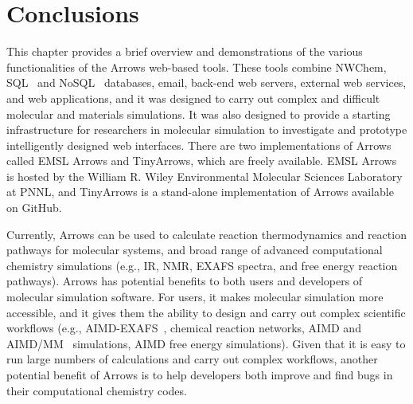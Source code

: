 \documentclass[runningheads,a4paper]{llncs}
\begin{document}
\section{Conclusions}

This chapter provides a brief overview and demonstrations of the various functionalities of the Arrows web-based tools. These tools combine NWChem, SQL~\cite{chamberlin1974sequel,hursch1988sql} and NoSQL~\cite{stonebraker2010sql} databases, email, back-end web servers, external web services, and web applications, and it was designed to carry out complex and difficult molecular and materials simulations.  It was also designed to provide a starting infrastructure for researchers in molecular simulation to investigate and prototype intelligently designed web interfaces.  There are two implementations of Arrows called EMSL Arrows and TinyArrows, which are freely available. EMSL Arrows is hosted by the William R. Wiley Environmental Molecular Sciences Laboratory at PNNL, and TinyArrows is a stand-alone implementation of Arrows available on GitHub.

Currently, Arrows can be used to calculate reaction thermodynamics and reaction pathways for molecular systems, and broad range of advanced computational chemistry simulations (e.g., IR, NMR, EXAFS spectra, and free energy reaction pathways). Arrows has potential benefits to both users and developers of molecular simulation software.  For users, it makes molecular simulation more accessible, and it gives them the ability to design and carry out complex scientific workflows (e.g., AIMD-EXAFS~\cite{fulton2012near,nichols2008equatorial}, chemical reaction networks, AIMD and AIMD/MM~\cite{laio2002hamiltonian,cauet2010structure}
simulations, AIMD free energy simulations).  
Given that it is easy to run large numbers of calculations and carry out complex workflows, another potential benefit of Arrows is to help developers both improve and find bugs in their computational chemistry codes.
\end{document}
